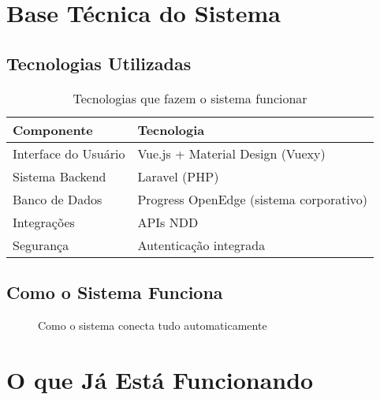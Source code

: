 \documentclass[12pt,a4paper]{article}
\begin{document}
\section{Base Técnica do Sistema}

\subsection{Tecnologias Utilizadas}
\begin{table}[H]
    \centering
    \begin{tabularx}{\textwidth}{|X|X|}
        \hline
        \textbf{Componente} & \textbf{Tecnologia} \\
        \hline
        Interface do Usuário & Vue.js + Material Design (Vuexy) \\
        Sistema Backend & Laravel (PHP) \\
        Banco de Dados & Progress OpenEdge (sistema corporativo) \\
        Integrações & APIs NDD \\
        Segurança & Autenticação integrada \\
        \hline
    \end{tabularx}
    \caption{Tecnologias que fazem o sistema funcionar}
\end{table}

\subsection{Como o Sistema Funciona}
\begin{figure}[H]
    \centering
    \caption{Como o sistema conecta tudo automaticamente}
\end{figure}

\section{O que Já Está Funcionando}
\end{document}
